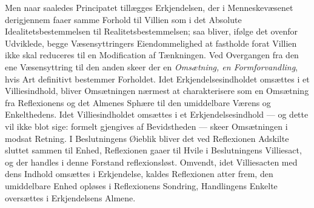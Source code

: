 \documentclass[12pt,a4paper]{book}
\begin{document}
Men naar saaledes Principatet tillægges Erkjendelsen, der i
Menneskevæsenet derigjennem faaer samme Forhold til Villien som i det
Absolute Idealitetsbestemmelsen til Realitetsbestemmelsen; saa bliver,
ifølge det ovenfor Udviklede, begge Væsensyttringers Eiendommelighed at
fastholde forat Villien ikke skal reduceres til en Modification af
Tænkningen. Ved Overgangen fra den ene Væsensyttring til den anden
skeer der en \emph{Omsætning, en Formforvandling}, hvis Art definitivt
bestemmer Forholdet. Idet Erkjendelsesindholdet omsættes i et
Villiesindhold, bliver Omsætningen nærmest at charakterisere som en
Omsætning fra Reflexionens og det Almenes Sphære til den umiddelbare
Værens og Enkelthedens. Idet Villiesindholdet omsættes i et
Erkjendelsesindhold --- og dette vil ikke blot sige: formelt gjengives
af Bevidstheden --- skeer Omsætningen i modsat Retning. I Beslutningens
Øieblik bliver det ved Reflexionen Adskilte sluttet sammen til Enhed,
Reflexionen gaaer til Hvile i Beslutningens Villiesact, og der handles
i denne Forstand reflexionsløst. Omvendt, idet Villiesacten med dens
Indhold omsættes i Erkjendelse, kaldes Reflexionen atter frem, den
umiddelbare Enhed opløses i Reflexionens Sondring, Handlingens Enkelte
oversættes i Erkjendelsens Almene.
\end{document}
